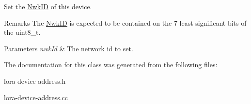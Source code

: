 Set the \hyperlink{classns3_1_1lorawan_1_1NwkID}{Nwk\+ID} of this device.

\begin{DoxyRemark}{Remarks}
The \hyperlink{classns3_1_1lorawan_1_1NwkID}{Nwk\+ID} is expected to be contained on the 7 least significant bits of the uint8\+\_\+t.
\end{DoxyRemark}

\begin{DoxyParams}{Parameters}
{\em nwk\+Id} & The network id to set. \\
\hline
\end{DoxyParams}


The documentation for this class was generated from the following files\+:\begin{DoxyCompactItemize}
\item 
lora-\/device-\/address.\+h\item 
lora-\/device-\/address.\+cc\end{DoxyCompactItemize}
